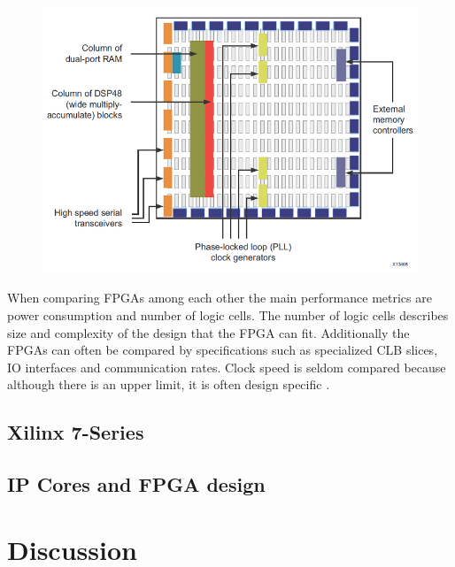 \documentclass[12pt]{report}
\begin{document}
\begin{figure}[h]
    \centering
    \includegraphics[scale=0.5]{figures/contemporary_fpga.png}
    \caption{ \citep{XilFPGAIntro}}
    \label{fig:5}
\end{figure}

When comparing FPGAs among each other the main performance metrics are power consumption and number of logic cells. The number of logic cells describes size and complexity of the design that the FPGA can fit. Additionally the FPGAs can often be compared by specifications such as specialized CLB slices, IO interfaces and communication rates. Clock speed is seldom compared because although there is an upper limit, it is often design specific \citep{XilClbMan} \citep{XilFPGAIntro}.

\section{Xilinx 7-Series}
  

\section{IP Cores and FPGA design}


\chapter{Discussion}




\end{document}
